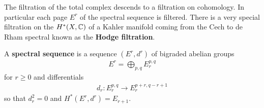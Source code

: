 \documentclass[12pt]{article}
\begin{document}
The filtration of the total complex descends to a filtration on
cohomology. In particular each page $E^r$ of the spectral sequence is
filtered. There is a very special filtration on the $H^*(X,\mathbb{C})$ of a Kahler manifold
coming from the Cech to de Rham spectral known as the \textbf{Hodge filtration}.
\begin{definition}
    A \textbf{spectral sequence} is a sequence $(E^r,d^r)$ of bigraded abelian groups \begin{align*}
        E^r = \bigoplus_{p,q} E^{p,q}_r
    \end{align*} for $r\geq 0$ and differentials \begin{align*}
        d_r: E^{p,q}_r \to E^{p+r,q-r+1}_r
    \end{align*} so that $d_r^2 = 0$ and $H^*(E^r,d^r) = E_{r+1}$.
\end{definition}
\end{document}
